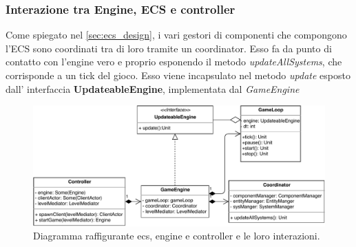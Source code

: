 	\subsubsection{Interazione tra Engine, ECS e controller}
	 
	Come spiegato nel \ref{sec:ecs_design}, i vari gestori di componenti che compongono l'ECS sono coordinati tra di loro tramite un coordinator. Esso fa da punto di contatto con l'engine vero e proprio esponendo il metodo \emph{updateAllSystems}, che corrisponde a un tick del gioco. Esso viene incapsulato nel metodo \emph{update} esposto dall' interfaccia \textbf{UpdateableEngine}, implementata dal \emph{GameEngine}
	\begin{figure}[H]
		\centering
		\includegraphics[width=\columnwidth]{drawio/ECS-engine-controller/ecs-engine-controller.pdf}
		\caption{Diagramma raffigurante ecs, engine e controller e le loro interazioni.}
		\label{fig:ecsenginecontroller}
	\end{figure}